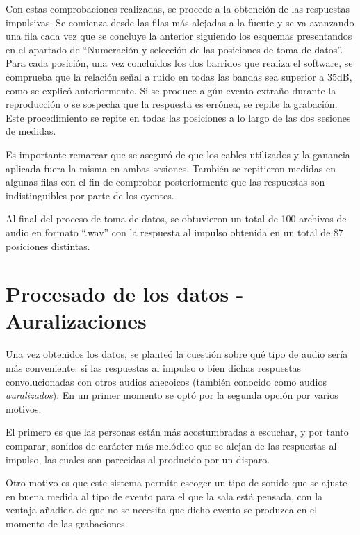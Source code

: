 \documentclass[11pt,a4paper,twoside]{book}
\begin{document}
            Con estas comprobaciones realizadas, se procede a la obtención de las respuestas impulsivas. Se comienza desde las filas más alejadas a la fuente y se va avanzando una fila cada vez que se concluye la anterior siguiendo los esquemas presentandos en el apartado de ``Numeración y selección de las posiciones de toma de datos''. Para cada posición, una vez concluidos los dos barridos que realiza el software, se comprueba que la relación señal a ruido en todas las bandas sea superior a 35dB, como se explicó anteriormente. Si se produce algún evento extraño durante la reproducción o se sospecha que la respuesta es errónea, se repite la grabación. Este procedimiento se repite en todas las posiciones a lo largo de las dos sesiones de medidas.
        
            Es importante remarcar que se aseguró de que los cables utilizados y la ganancia aplicada fuera la misma en ambas sesiones. También se repitieron medidas en algunas filas con el fin de comprobar posteriormente que las respuestas son indistinguibles por parte de los oyentes.
        
            Al  final del proceso de toma de datos, se obtuvieron un total de 100 archivos de audio en formato ``.wav'' con la respuesta al impulso obtenida en un total de 87 posiciones distintas.
            
            \section{Procesado de los datos - Auralizaciones}
                Una vez obtenidos los datos, se planteó la cuestión sobre qué tipo de audio sería más conveniente: si las respuestas al impulso o bien dichas respuestas convolucionadas con otros audios anecoicos (también conocido como audios \textit{auralizados}). En un primer momento se optó por la segunda opción por varios motivos.
        
                El primero es que las personas están más acostumbradas a escuchar, y por tanto comparar, sonidos de carácter más melódico que se alejan de las respuestas al impulso, las cuales son parecidas al producido por un disparo.
        
                Otro motivo es que este sistema permite escoger un tipo de sonido que se ajuste en buena medida al tipo de evento para el que la sala está pensada, con la ventaja añadida de que no se necesita que dicho evento se produzca en el momento de las grabaciones.
        
\end{document}
